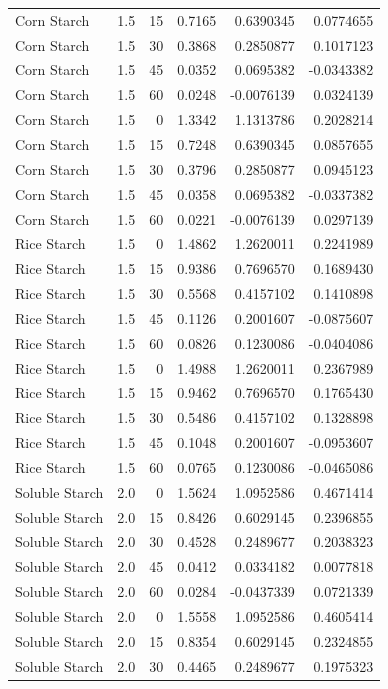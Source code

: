 \documentclass[
  12pt,
]{article}
\begin{document}
{\begin{longtable}[]{@{}lrrrrr@{}}
Corn Starch & 1.5 & 15 & 0.7165 & 0.6390345 & 0.0774655 \\
Corn Starch & 1.5 & 30 & 0.3868 & 0.2850877 & 0.1017123 \\
Corn Starch & 1.5 & 45 & 0.0352 & 0.0695382 & -0.0343382 \\
Corn Starch & 1.5 & 60 & 0.0248 & -0.0076139 & 0.0324139 \\
Corn Starch & 1.5 & 0 & 1.3342 & 1.1313786 & 0.2028214 \\
Corn Starch & 1.5 & 15 & 0.7248 & 0.6390345 & 0.0857655 \\
Corn Starch & 1.5 & 30 & 0.3796 & 0.2850877 & 0.0945123 \\
Corn Starch & 1.5 & 45 & 0.0358 & 0.0695382 & -0.0337382 \\
Corn Starch & 1.5 & 60 & 0.0221 & -0.0076139 & 0.0297139 \\
Rice Starch & 1.5 & 0 & 1.4862 & 1.2620011 & 0.2241989 \\
Rice Starch & 1.5 & 15 & 0.9386 & 0.7696570 & 0.1689430 \\
Rice Starch & 1.5 & 30 & 0.5568 & 0.4157102 & 0.1410898 \\
Rice Starch & 1.5 & 45 & 0.1126 & 0.2001607 & -0.0875607 \\
Rice Starch & 1.5 & 60 & 0.0826 & 0.1230086 & -0.0404086 \\
Rice Starch & 1.5 & 0 & 1.4988 & 1.2620011 & 0.2367989 \\
Rice Starch & 1.5 & 15 & 0.9462 & 0.7696570 & 0.1765430 \\
Rice Starch & 1.5 & 30 & 0.5486 & 0.4157102 & 0.1328898 \\
Rice Starch & 1.5 & 45 & 0.1048 & 0.2001607 & -0.0953607 \\
Rice Starch & 1.5 & 60 & 0.0765 & 0.1230086 & -0.0465086 \\
Soluble Starch & 2.0 & 0 & 1.5624 & 1.0952586 & 0.4671414 \\
Soluble Starch & 2.0 & 15 & 0.8426 & 0.6029145 & 0.2396855 \\
Soluble Starch & 2.0 & 30 & 0.4528 & 0.2489677 & 0.2038323 \\
Soluble Starch & 2.0 & 45 & 0.0412 & 0.0334182 & 0.0077818 \\
Soluble Starch & 2.0 & 60 & 0.0284 & -0.0437339 & 0.0721339 \\
Soluble Starch & 2.0 & 0 & 1.5558 & 1.0952586 & 0.4605414 \\
Soluble Starch & 2.0 & 15 & 0.8354 & 0.6029145 & 0.2324855 \\
Soluble Starch & 2.0 & 30 & 0.4465 & 0.2489677 & 0.1975323 \\

\end{longtable}}
\end{document}
